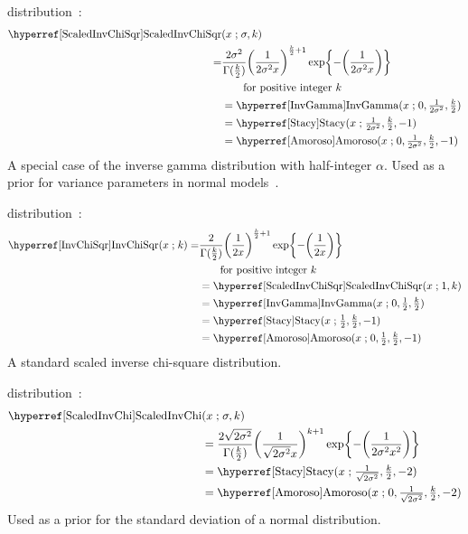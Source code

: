   distribution~\cite{Gelman2004}:
\begin{align}
\label{ScaledInvChiSqr}
\opr{ScaledInvChiSqr}&(x \given \sigma, k) 
\\ \notag =& \frac{2 \sigma^2}{\Gamma(\tfrac{k}{2}) } \Left(\frac{1}{2 \sigma^2x}\Right)^{\frac{k}{2}+1} 
\exp\Left\{-\Left( \frac{1}{2 \sigma^2x}   \Right)\Right\} \checked
\\
&\qquad  \text{for positive integer } k \notag \\
&=  \opr{InvGamma}(x\given 0, \tfrac{1}{2 \sigma^2}, \tfrac{k}{2}) \notag  \checked \\
&= \opr{Stacy}(x\given  \tfrac{1}{2 \sigma ^2},\tfrac{k}{2}, -1)  \notag  \checked \\
&=  \opr{Amoroso}(x\given  0, \tfrac{1}{2 \sigma ^2}, \tfrac{k}{2}, -1) \checked \notag 
\end{align}
A special case of the inverse gamma distribution with half-integer $\alpha$. Used as a prior for variance parameters in normal models~\cite{Gelman2004}.



 distribution~\cite{Gelman2004}: 
%
\begin{align}
\label{InvChiSqr}
\opr{InvChiSqr}(x \given k) 
=& \frac{2}{\Gamma(\tfrac{k}{2}) } \Left(\frac{1}{2x}\Right)^{\frac{k}{2}+1} \exp\Left\{-\Left( \frac{1}{2x}  \Right)\Right\}
\checked  \\
&\qquad  \text{for positive integer } k \notag \\
& = \opr{ScaledInvChiSqr}(x\given 1,k)\notag \checked \\
&=  \opr{InvGamma}(x\given 0, \tfrac{1}{2}, \tfrac{k}{2}) \notag \checked \\
&=  \opr{Stacy}(x\given \tfrac{1}{2}, \tfrac{k}{2},-1) \notag  \checked\\
&=  \opr{Amoroso}(x\given  0, \tfrac{1}{2}, \tfrac{k}{2}, -1)  \checked\notag 
\end{align}
A standard scaled inverse chi-square distribution.



 distribution~\cite{Lee2012}:
\begin{align}
\label{ScaledInvChi}
 \opr{ScaledInvChi}&(x \given \sigma, k) 
\\ \notag
&= \frac{2 \sqrt{2 \sigma ^2} }{ \Gamma(\tfrac{k}{2})} { \Left(\frac{1}{\sqrt{2 \sigma^2} x}\Right)}^{k+1} \exp\Left\{-\Left(\frac{1}{2 \sigma^2 x^2}  \Right)\Right\} \checked
\\
&=  \opr{Stacy}(x\given \tfrac{1}{\sqrt{2 \sigma^2}}, \tfrac{k}{2}, -2)  \notag \checked \\
&=  \opr{Amoroso}(x\given  0, \tfrac{1}{\sqrt{2 \sigma^2}}, \tfrac{k}{2}, -2) \notag  \checked
\end{align}
Used as a prior for the standard deviation of a normal distribution.



